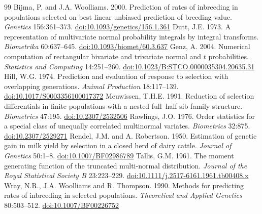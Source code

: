 \documentclass[11pt]{article}
\begin{document}
\begin{thebibliography}{99}
 Bijma, P. and J.A. Woolliams. 2000. Prediction of rates of inbreeding in populations selected on best linear unbiased prediction of breeding value. \emph{Genetics} 156:361--373. \href{https://doi.org/10.1093/genetics/156.1.361}{doi:10.1093/genetics/156.1.361}
 Dutt, J.E. 1973. A representation of multivariate normal probability integrals by integral transforms. \emph{Biometrika} 60:637--645. \href{https://doi.org/10.1093/biomet/60.3.637}{doi:10.1093/biomet/60.3.637}
 Genz, A. 2004. Numerical computation of rectangular bivariate and trivariate normal and $t$ probabilities. \emph{Statistics and Computing} 14:251--260. \href{https://doi.org/10.1023/B:STCO.0000035304.20635.31}{doi:10.1023/B:STCO.0000035304.20635.31}
 Hill, W.G. 1974. Prediction and evaluation of response to selection with overlapping generations. \emph{Animal Production} 18:117--139. \href{https://doi.org/10.1017/S0003356100017372}{doi:10.1017/S0003356100017372}
 Meuwissen, T.H.E. 1991. Reduction of selection differentials in finite populations with a nested full--half sib family structure. \emph{Biometrics} 47:195. \href{https://doi.org/10.2307/2532506}{doi:10.2307/2532506}
 Rawlings, J.O. 1976. Order statistics for a special class of unequally correlated multinormal variates. \emph{Biometrics} 32:875. \href{https://doi.org/10.2307/2529271}{doi:10.2307/2529271}
 Rendel, J.M. and A. Robertson. 1950. Estimation of genetic gain in milk yield by selection in a closed herd of dairy cattle. \emph{Journal of Genetics} 50:1--8. \href{https://doi.org/10.1007/BF02986789}{doi:10.1007/BF02986789}
 Tallis, G.M. 1961. The moment generating function of the truncated multi-normal distribution. \emph{Journal of the Royal Statistical Society B} 23:223--229. \href{https://doi.org/10.1111/j.2517-6161.1961.tb00408.x}{doi:10.1111/j.2517-6161.1961.tb00408.x}
 Wray, N.R., J.A. Woolliams and R. Thompson. 1990. Methods for predicting rates of inbreeding in selected populations. \emph{Theoretical and Applied Genetics} 80:503--512. \href{https://doi.org/10.1007/BF00226752}{doi:10.1007/BF00226752}
\end{thebibliography}

\appendix
\end{document}

